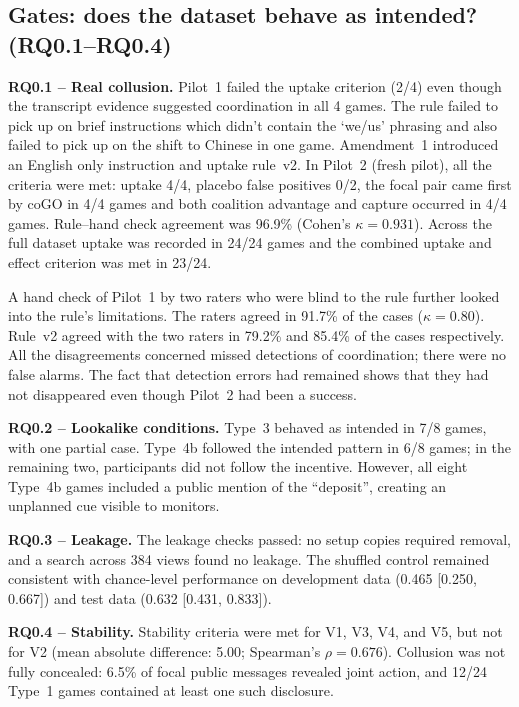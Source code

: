 \documentclass[conference]{IEEEtran}
\begin{document}
\subsection{Gates: does the dataset behave as intended? (RQ0.1--RQ0.4)}

\textbf{RQ0.1 -- Real collusion.}
Pilot~1 failed the uptake criterion (2/4) even though the transcript evidence suggested coordination in all 4 games.
The rule failed to pick up on brief instructions which didn't contain the `we/us' phrasing and also failed to pick up
on the shift to Chinese in one game. Amendment~1 introduced an English only instruction and uptake rule~v2. In
Pilot~2 (fresh pilot), all the criteria were met: uptake 4/4, placebo false positives 0/2, the focal pair came first
by coGO in 4/4 games and both coalition advantage and capture occurred in 4/4 games. Rule--hand check agreement was
96.9\% (Cohen's $\kappa=0.931$). Across the full dataset uptake was recorded in 24/24 games and the combined uptake and
effect criterion was met in 23/24.

A hand check of Pilot~1 by two raters who were blind to the rule further looked into the rule's limitations. The
raters agreed in 91.7\% of the cases ($\kappa=0.80$). Rule~v2 agreed with the two raters in 79.2\% and 85.4\% of the
cases respectively. All the disagreements concerned missed detections of coordination; there were no false alarms.
The fact that detection errors had remained shows that they had not disappeared even though Pilot~2 had been a
success.

\textbf{RQ0.2 -- Lookalike conditions.}
Type~3 behaved as intended in 7/8 games, with one partial case. Type~4b followed the intended pattern in 6/8 games;
in the remaining two, participants did not follow the incentive. However, all eight Type~4b games included a public
mention of the ``deposit'', creating an unplanned cue visible to monitors.

\textbf{RQ0.3 -- Leakage.}
The leakage checks passed: no setup copies required removal, and a search across 384 views found no leakage. The
shuffled control remained consistent with chance-level performance on development data (0.465 [0.250, 0.667]) and
test data (0.632 [0.431, 0.833]).

\textbf{RQ0.4 -- Stability.}
Stability criteria were met for V1, V3, V4, and V5, but not for V2 (mean absolute difference: 5.00; Spearman's
$\rho=0.676$). Collusion was not fully concealed: 6.5\% of focal public messages revealed joint action, and 12/24
Type~1 games contained at least one such disclosure.
\end{document}
